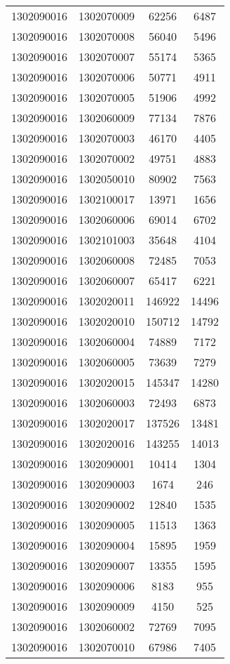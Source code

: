 \begin{longtable}[h]{llcc}
		1302090016 & 1302070009 & 62256 & 6487\\
		1302090016 & 1302070008 & 56040 & 5496\\
		1302090016 & 1302070007 & 55174 & 5365\\
		1302090016 & 1302070006 & 50771 & 4911\\
		1302090016 & 1302070005 & 51906 & 4992\\
		1302090016 & 1302060009 & 77134 & 7876\\
		1302090016 & 1302070003 & 46170 & 4405\\
		1302090016 & 1302070002 & 49751 & 4883\\
		1302090016 & 1302050010 & 80902 & 7563\\
		1302090016 & 1302100017 & 13971 & 1656\\
		1302090016 & 1302060006 & 69014 & 6702\\
		1302090016 & 1302101003 & 35648 & 4104\\
		1302090016 & 1302060008 & 72485 & 7053\\
		1302090016 & 1302060007 & 65417 & 6221\\
		1302090016 & 1302020011 & 146922 & 14496\\
		1302090016 & 1302020010 & 150712 & 14792\\
		1302090016 & 1302060004 & 74889 & 7172\\
		1302090016 & 1302060005 & 73639 & 7279\\
		1302090016 & 1302020015 & 145347 & 14280\\
		1302090016 & 1302060003 & 72493 & 6873\\
		1302090016 & 1302020017 & 137526 & 13481\\
		1302090016 & 1302020016 & 143255 & 14013\\
		1302090016 & 1302090001 & 10414 & 1304\\
		1302090016 & 1302090003 & 1674 & 246\\
		1302090016 & 1302090002 & 12840 & 1535\\
		1302090016 & 1302090005 & 11513 & 1363\\
		1302090016 & 1302090004 & 15895 & 1959\\
		1302090016 & 1302090007 & 13355 & 1595\\
		1302090016 & 1302090006 & 8183 & 955\\
		1302090016 & 1302090009 & 4150 & 525\\
		1302090016 & 1302060002 & 72769 & 7095\\
		1302090016 & 1302070010 & 67986 & 7405\\

\end{longtable}

